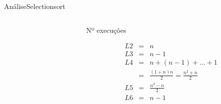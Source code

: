 \documentclass[aspectratio=169]{beamer}
\begin{document}
\begin{frame}[fragile]{Análise}{Selectionsort}
\begin{columns}[T] %
\begin{column}{.55\textwidth}

\end{column}%
\hfill%
\begin{column}{.45\textwidth}
Nº execuções
\begin{small}
\begin{eqnarray}
L2 &=& n \nonumber \\
L3 &=& n - 1\nonumber \\
L4 &=& n + (n-1) + ... + 1 \nonumber \\   
   &=& \frac{(1+n)n}{2} = \frac{n^2+n}{2} \nonumber \\
L5 &=& \frac{n^2-n}{2}  \nonumber \\
L6 &=& n - 1 \nonumber
\end{eqnarray}
\end{small}
\end{column}%
\end{columns}
\end{frame}

\end{document}
